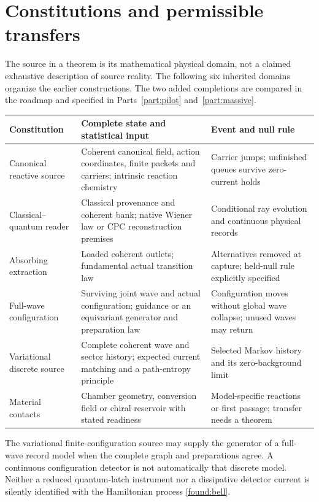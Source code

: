 \documentclass[11pt,oneside,openany]{book}
\theoremstyle{definition}
\theoremstyle{remark}\newtheorem{remark}[theorem]{Remark}
\begin{document}
\section{Constitutions and permissible transfers}
The source in a theorem is its mathematical physical domain, not a claimed exhaustive description of source reality. The following six inherited domains organize the earlier constructions. The two added completions are compared in the roadmap and specified in Parts~\ref{part:pilot} and~\ref{part:massive}.
\begin{center}\small
\begin{tabularx}{\textwidth}{@{}>{\raggedright\arraybackslash}p{}XX@{}}\toprule
Constitution & Complete state and statistical input & Event and null rule\\\midrule
Canonical reactive source & Coherent canonical field, action coordinates, finite packets and carriers; intrinsic reaction chemistry & Carrier jumps; unfinished queues survive zero-current holds\\
Classical--quantum reader & Classical provenance and coherent bank; native Wiener law or CPC reconstruction premises & Conditional ray evolution and continuous physical records\\
Absorbing extraction & Loaded coherent outlets; fundamental actual transition law & Alternatives removed at capture; held-null rule explicitly specified\\
Full-wave configuration & Surviving joint wave and actual configuration; guidance or an equivariant generator and preparation law & Configuration moves without global wave collapse; unused waves may return\\
Variational discrete source & Complete coherent wave and sector history; expected current matching and a path-entropy principle & Selected Markov history and its zero-background limit\\
Material contacts & Chamber geometry, conversion field or chiral reservoir with stated readiness & Model-specific reactions or first passage; transfer needs a theorem\\\bottomrule
\end{tabularx}
\end{center}
The variational finite-configuration source may supply the generator of a full-wave record model when the complete graph and preparations agree. A continuous configuration detector is not automatically that discrete model. Neither a reduced quantum-latch instrument nor a dissipative detector current is silently identified with the Hamiltonian process \eqref{found:bell}.
\end{document}
